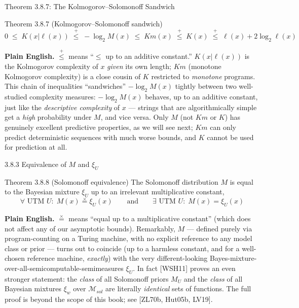 \documentclass[aspectratio=169,10pt]{beamer}
\newcommand{\Mcal}{\mathcal{M}}
\newcommand{\Km}{Km}
\begin{document}
\begin{frame}{Theorem 3.8.7: The Kolmogorov--Solomonoff Sandwich}
  \begin{block}{Theorem 3.8.7 (Kolmogorov--Solomonoff sandwich)}
    \[
      0 \; \le \; K(x|\ell(x)) \; \overset{+}{\le} \; -\log_2 M(x) \; \le \; \Km(x)
      \; \overset{+}{\le} \; K(x) \; \overset{+}{\le} \; \ell(x)+2\log_2\ell(x)
    \]
  \end{block}
  \textbf{Plain English.} $\overset{+}{\le}$ means ``$\le$ up to an additive
  constant.'' $K(x|\ell(x))$ is the Kolmogorov complexity of $x$ \emph{given}
  its own length; $\Km$ (monotone Kolmogorov complexity) is a close cousin of
  $K$ restricted to \emph{monotone} programs. This chain of inequalities
  ``sandwiches'' $-\log_2 M(x)$ tightly between two well-studied complexity
  measures: $-\log_2 M(x)$ behaves, up to an additive constant, just like the
  \emph{descriptive complexity} of $x$ --- strings that are algorithmically
  simple get a \emph{high} probability under $M$, and vice versa. Only $M$
  (not $\Km$ or $K$) has genuinely excellent predictive properties, as we
  will see next; $\Km$ can only predict deterministic sequences with much
  worse bounds, and $K$ cannot be used for prediction at all.
\end{frame}

\begin{frame}{3.8.3 Equivalence of $M$ and $\xi_U$}
  \begin{block}{Theorem 3.8.8 (Solomonoff equivalence)}
    The Solomonoff distribution $M$ is equal to the Bayesian mixture $\xi_U$
    up to an irrelevant multiplicative constant,
    \[
      \forall\text{ UTM } U:\; M(x)\overset{\times}{=}\xi_U(x)
      \qquad\text{and}\qquad
      \exists\text{ UTM }U:\; M(x)=\xi_U(x)
    \]
  \end{block}
  \textbf{Plain English.} $\overset{\times}{=}$ means ``equal up to a
  multiplicative constant'' (which does not affect any of our asymptotic
  bounds). Remarkably, $M$ --- defined purely via program-counting on a
  Turing machine, with no explicit reference to any model class or prior ---
  turns out to coincide (up to a harmless constant, and for a well-chosen
  reference machine, \emph{exactly}) with the very different-looking
  Bayes-mixture-over-all-semicomputable-semimeasures $\xi_U$. In fact
  [WSH11] proves an even stronger statement: the \emph{class} of all
  Solomonoff priors $M_U$ and the \emph{class} of all Bayesian mixtures
  $\xi_w$ over $\Mcal_{sol}$ are literally \emph{identical} sets of
  functions. The full proof is beyond the scope of this book; see
  [ZL70b, Hut05b, LV19].
\end{frame}
\end{document}
